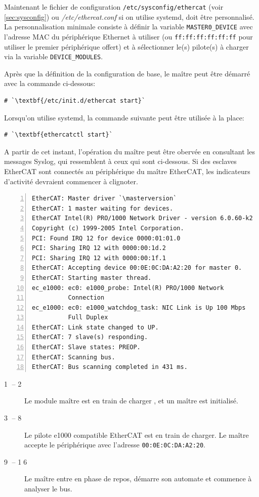 \documentclass[a4paper,12pt,BCOR=6mm,bibtotoc,idxtotoc]{scrbook}
\newcommand{\masterversion}{1.5.2}
\newcommand{\linenum}[1]{\normalfont\textcircled{\tiny #1}}
\begin{document}
Maintenant le fichier de configuration
\texttt{/etc/sysconfig/ethercat} (voir \autoref{sec:sysconfig}) ou
\textit{/etc/ethercat.conf} si on utilise systemd, doit \^etre
personnalis\'e.  La personnalisation minimale consiste \`a d\'efinir
la variable \lstinline+MASTER0_DEVICE+ avec l'adresse MAC du
p\'eriph\'erique Ethernet \`a utiliser (ou
\lstinline+ff:ff:ff:ff:ff:ff+ pour utiliser le premier
p\'eriph\'erique offert) et \`a s\'electionner le(s) pilote(s) \`a
charger via la variable \lstinline+DEVICE_MODULES+.

Apr\`es que la d\'efinition de la configuration de base, le ma\^itre
peut \^etre d\'emarr\'e avec la commande ci-dessous:

\begin{lstlisting}
# `\textbf{/etc/init.d/ethercat start}`
\end{lstlisting}

Lorsqu'on utilise systemd, la commande suivante peut \^etre utilis\'ee
\`a la place:

\begin{lstlisting}
# `\textbf{ethercatctl start}`
\end{lstlisting}

A partir de cet instant, l'op\'eration du ma\^itre peut \^etre oberv\'ee
en consultant les messages Syslog, qui ressemblent \`a
ceux qui sont ci-dessous. Si des esclaves EtherCAT sont connect\'es
au p\'eriph\'erique du ma\^itre EtherCAT, les indicateurs d'activit\'e
devraient commencer \`a clignoter.

\begin{lstlisting}[numbers=left]
EtherCAT: Master driver `\masterversion`
EtherCAT: 1 master waiting for devices.
EtherCAT Intel(R) PRO/1000 Network Driver - version 6.0.60-k2
Copyright (c) 1999-2005 Intel Corporation.
PCI: Found IRQ 12 for device 0000:01:01.0
PCI: Sharing IRQ 12 with 0000:00:1d.2
PCI: Sharing IRQ 12 with 0000:00:1f.1
EtherCAT: Accepting device 00:0E:0C:DA:A2:20 for master 0.
EtherCAT: Starting master thread.
ec_e1000: ec0: e1000_probe: Intel(R) PRO/1000 Network
          Connection
ec_e1000: ec0: e1000_watchdog_task: NIC Link is Up 100 Mbps
          Full Duplex
EtherCAT: Link state changed to UP.
EtherCAT: 7 slave(s) responding.
EtherCAT: Slave states: PREOP.
EtherCAT: Scanning bus.
EtherCAT: Bus scanning completed in 431 ms.
\end{lstlisting}

\begin{description}

\item[\linenum{1} -- \linenum{2}] Le module ma\^itre est en train de charger , et un ma\^itre est initialis\'e.

\item[\linenum{3} -- \linenum{8}] Le pilote e1000 compatible EtherCAT
  est en train de charger. Le ma\^itre accepte le p\'eriph\'erique avec
  l'adresse \lstinline+00:0E:0C:DA:A2:20+.

\item[\linenum{9} -- \linenum{16}] Le ma\^itre entre en phase de repos,
  d\'emarre son automate et commence \`a analyser le bus.

\end{description}
\end{document}
